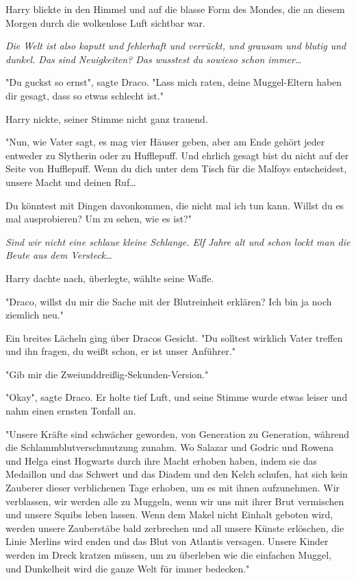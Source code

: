 {Harry blickte in den Himmel und auf die blasse Form des Mondes, die an diesem Morgen durch die wolkenlose Luft sichtbar war.

\emph{Die Welt ist also kaputt und fehlerhaft und verrückt, und grausam und blutig und dunkel. Das sind Neuigkeiten? Das wusstest du sowieso schon immer…}

"Du guckst so ernst", sagte Draco. "Lass mich raten, deine Muggel-Eltern haben dir gesagt, dass so etwas schlecht ist."

Harry nickte, seiner Stimme nicht ganz trauend.

"Nun, wie Vater sagt, es mag vier Häuser geben, aber am Ende gehört jeder entweder zu Slytherin oder zu Hufflepuff. Und ehrlich gesagt bist du nicht auf der Seite von Hufflepuff. Wenn du dich unter dem Tisch für die Malfoys entscheidest, unsere Macht und deinen Ruf…

Du könntest mit Dingen davonkommen, die nicht mal ich tun kann. Willst du es mal ausprobieren? Um zu sehen, wie es ist?"

\emph{Sind wir nicht eine schlaue kleine Schlange. Elf Jahre alt und schon lockt man die Beute aus dem Versteck…}

Harry dachte nach, überlegte, wählte seine Waffe.

"Draco, willst du mir die Sache mit der Blutreinheit erklären? Ich bin ja noch ziemlich neu."

Ein breites Lächeln ging über Dracos Gesicht. "Du solltest wirklich Vater treffen und ihn fragen, du weißt schon, er ist unser Anführer."

"Gib mir die Zweiunddreißig-Sekunden-Version."

"Okay", sagte Draco. Er holte tief Luft, und seine Stimme wurde etwas leiser und nahm einen ernsten Tonfall an.

"Unsere Kräfte sind schwächer geworden, von Generation zu Generation, während die Schlammblutverschmutzung zunahm. Wo Salazar und Godric und Rowena und Helga einst Hogwarts durch ihre Macht erhoben haben, indem sie das Medaillon und das Schwert und das Diadem und den Kelch schufen, hat sich kein Zauberer dieser verblichenen Tage erhoben, um es mit ihnen aufzunehmen. Wir verblassen, wir werden alle zu Muggeln, wenn wir uns mit ihrer Brut vermischen und unsere Squibs leben lassen. Wenn dem Makel nicht Einhalt geboten wird, werden unsere Zauberstäbe bald zerbrechen und all unsere Künste erlöschen, die Linie Merlins wird enden und das Blut von Atlantis versagen. Unsere Kinder werden im Dreck kratzen müssen, um zu überleben wie die einfachen Muggel, und Dunkelheit wird die ganze Welt für immer bedecken."

}
